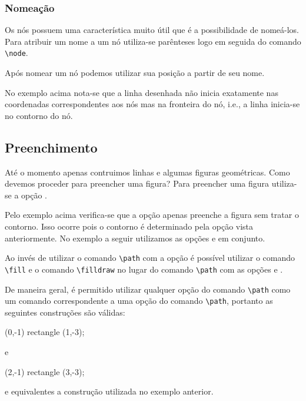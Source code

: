 \subsubsection{Nomea\c{c}\~{a}o}
Os n\'{o}s possuem uma caracter\'{i}stica muito \'{u}til que \'{e} a possibilidade de nome\'{a}-los. Para atribuir um nome a um n\'{o} utiliza-se par\^{e}nteses logo em seguida do comando \lstinline!\node!. \\

Ap\'{o}s nomear um n\'{o} podemos utilizar sua posi\c{c}\~{a}o a partir de seu nome. \\

No exemplo acima nota-se que a linha desenhada n\~{a}o inicia exatamente nas coordenadas correspondentes aos n\'{o}s mas na fronteira do n\'{o}, i.e., a linha inicia-se no contorno do n\'{o}. \\

\subsection{Preenchimento}
At\'{e} o momento apenas contruimos linhas e algumas figuras geom\'{e}tricas. Como devemos proceder para preencher uma figura? Para preencher uma figura utiliza-se a op\c{c}\~{a}o . \\

Pelo exemplo acima verifica-se que a op\c{c}\~{a}o  apenas preenche a figura sem tratar o contorno. Isso ocorre pois o contorno \'{e} determinado pela op\c{c}\~{a}o  vista anteriormente. No exemplo a seguir utilizamos as op\c{c}\~{o}es  e  em conjunto. \\

Ao inv\'{e}s de utilizar o comando \lstinline!\path! com a op\c{c}\~{a}o  \'{e} poss\'{i}vel utilizar o comando \lstinline!\fill! e o comando \lstinline!\filldraw! no lugar do comando \lstinline!\path! com as op\c{c}\~{o}es  e .

De maneira geral, \'{e} permitido utilizar qualquer op\c{c}\~{a}o do comando \lstinline!\path! como um comando correspondente a uma op\c{c}\~{a}o do comando \lstinline!\path!, portanto as seguintes constru\c{c}\~{o}es s\~{a}o v\'{a}lidas:
\begin{code}
\fill[draw=red] (0,-1) rectangle (1,-3);
\end{code}
e
\begin{code}
\draw[fill=blue] (2,-1) rectangle (3,-3);
\end{code}
e equivalentes a constru\c{c}\~{a}o utilizada no exemplo anterior.

